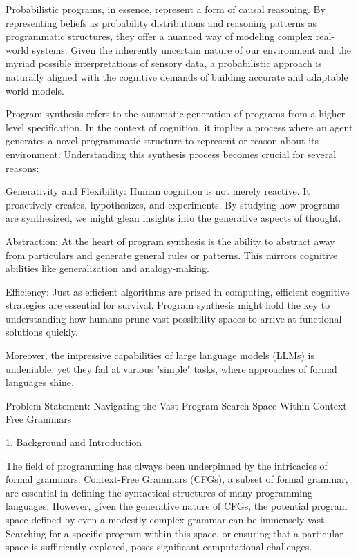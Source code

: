 Probabilistic programs, in essence, represent a form of causal reasoning. By representing beliefs as probability distributions and reasoning patterns as programmatic structures, they offer a nuanced way of modeling complex real-world systems. Given the inherently uncertain nature of our environment and the myriad possible interpretations of sensory data, a probabilistic approach is naturally aligned with the cognitive demands of building accurate and adaptable world models.

Program synthesis refers to the automatic generation of programs from a higher-level specification. In the context of cognition, it implies a process where an agent generates a novel programmatic structure to represent or reason about its environment. Understanding this synthesis process becomes crucial for several reasons:

Generativity and Flexibility: Human cognition is not merely reactive. It proactively creates, hypothesizes, and experiments. By studying how programs are synthesized, we might glean insights into the generative aspects of thought.

Abstraction: At the heart of program synthesis is the ability to abstract away from particulars and generate general rules or patterns. This mirrors cognitive abilities like generalization and analogy-making.

Efficiency: Just as efficient algorithms are prized in computing, efficient cognitive strategies are essential for survival. Program synthesis might hold the key to understanding how humans prune vast possibility spaces to arrive at functional solutions quickly.

Moreover, the impressive capabilities of large language models (LLMs) is undeniable, yet they fail at various "simple" tasks, where approaches of formal languages shine. 




Problem Statement: Navigating the Vast Program Search Space Within Context-Free Grammars

1. Background and Introduction

The field of programming has always been underpinned by the intricacies of formal grammars. Context-Free Grammars (CFGs), a subset of formal grammar, are essential in defining the syntactical structures of many programming languages. However, given the generative nature of CFGs, the potential program space defined by even a modestly complex grammar can be immensely vast. Searching for a specific program within this space, or ensuring that a particular space is sufficiently explored, poses significant computational challenges.

